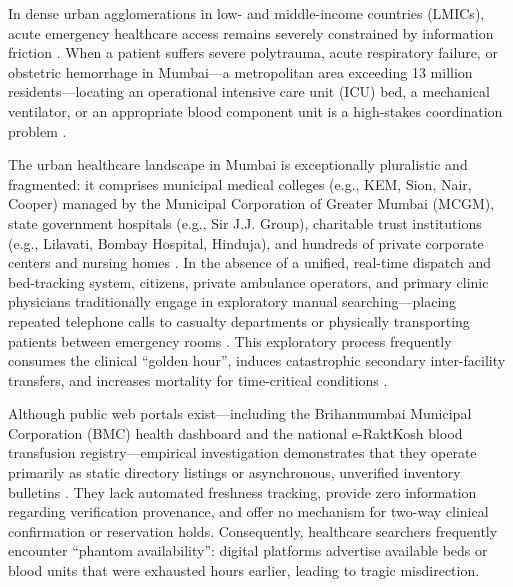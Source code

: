 \documentclass[conference]{IEEEtran}
\begin{document}
In dense urban agglomerations in low- and middle-income countries (LMICs), acute emergency healthcare access remains severely constrained by information friction \cite{metuge2026digital,dalton2019patient}. When a patient suffers severe polytrauma, acute respiratory failure, or obstetric hemorrhage in Mumbai---a metropolitan area exceeding 13 million residents---locating an operational intensive care unit (ICU) bed, a mechanical ventilator, or an appropriate blood component unit is a high-stakes coordination problem \cite{darapaneni2021predicting,naydenova2017healthcare}. 

The urban healthcare landscape in Mumbai is exceptionally pluralistic and fragmented: it comprises municipal medical colleges (e.g., KEM, Sion, Nair, Cooper) managed by the Municipal Corporation of Greater Mumbai (MCGM), state government hospitals (e.g., Sir J.J. Group), charitable trust institutions (e.g., Lilavati, Bombay Hospital, Hinduja), and hundreds of private corporate centers and nursing homes \cite{shinde2026insights,mcgm2021covidwarroom}. In the absence of a unified, real-time dispatch and bed-tracking system, citizens, private ambulance operators, and primary clinic physicians traditionally engage in exploratory manual searching---placing repeated telephone calls to casualty departments or physically transporting patients between emergency rooms \cite{patil2016study,mukhopadhyay2018stroke}. This exploratory process frequently consumes the clinical ``golden hour'', induces catastrophic secondary inter-facility transfers, and increases mortality for time-critical conditions \cite{naydenova2017healthcare,darapaneni2021predicting}.

Although public web portals exist---including the Brihanmumbai Municipal Corporation (BMC) health dashboard and the national e-RaktKosh blood transfusion registry---empirical investigation demonstrates that they operate primarily as static directory listings or asynchronous, unverified inventory bulletins \cite{metuge2026digital}. They lack automated freshness tracking, provide zero information regarding verification provenance, and offer no mechanism for two-way clinical confirmation or reservation holds. Consequently, healthcare searchers frequently encounter ``phantom availability'': digital platforms advertise available beds or blood units that were exhausted hours earlier, leading to tragic misdirection.
\end{document}
